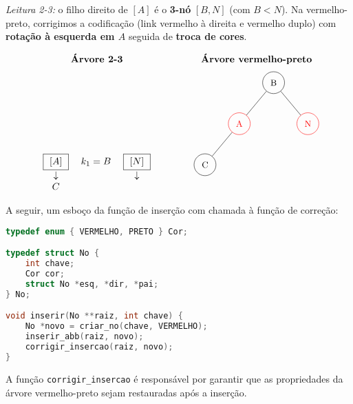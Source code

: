 \begin{itemize}
\noindent
\emph{Leitura 2-3:} o filho direito de \([A]\) é o \textbf{3-nó} \([B,N]\) (com \(B < N\)).  
Na vermelho-preto, corrigimos a codificação (link vermelho à direita e vermelho duplo) com \textbf{rotação à esquerda em \(A\)} seguida de \textbf{troca de cores}.

\medskip

\begin{center}
\renewcommand{\arraystretch}{1.5}
\[
\begin{array}{ccc}
\textbf{Árvore 2-3} & & \textbf{Árvore vermelho-preto} \\[6pt]

\begin{array}{ccc}
  \boxed{\ [A]\ } & \; k_1 = B \; & \boxed{\ [N]\ } \\
  \downarrow      &               & \downarrow      \\
  C               &               &                 \\  
\end{array}
&\qquad&
\begin{tikzpicture}[
  every node/.style={draw, circle, minimum size=8mm, inner sep=0pt, font=\small},
  level distance=1.5cm, sibling distance=2.5cm
]
\tikzset{
  preto/.style={draw=black},
  vermelho/.style={draw=red, text=red}
}
\node[preto] {B}
  child {
    node[vermelho] {A}
      child { node[preto] {C} }
      child[missing]
  }
  child { node[vermelho] {N} };
\end{tikzpicture}
\end{array}
\]
\end{center}


\end{itemize}


A seguir, um esboço da função de inserção com chamada à função de correção:

\begin{lstlisting}[language=C, caption={Inserção em árvore vermelho-preto (esboço)}, label=lst:insercao_rb]
typedef enum { VERMELHO, PRETO } Cor;

typedef struct No {
    int chave;
    Cor cor;
    struct No *esq, *dir, *pai;
} No;

void inserir(No **raiz, int chave) {
    No *novo = criar_no(chave, VERMELHO);
    inserir_abb(raiz, novo);
    corrigir_insercao(raiz, novo);
}
\end{lstlisting}

A função \texttt{corrigir\_insercao} é responsável por garantir que as propriedades da árvore vermelho-preto sejam restauradas após a inserção.

